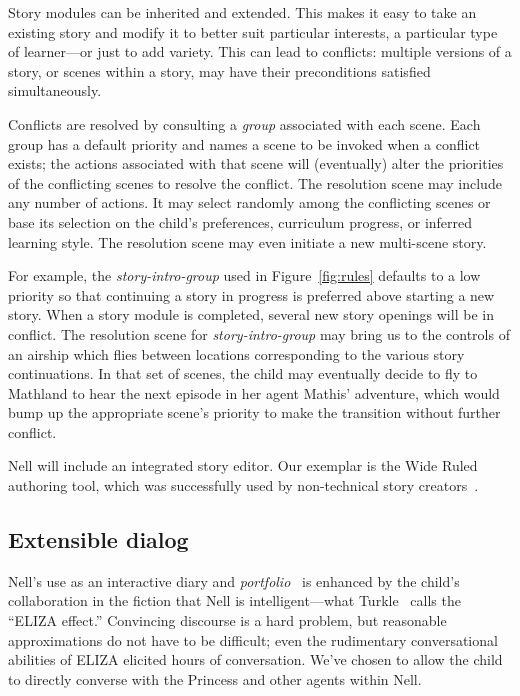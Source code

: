 \documentclass[preprint]{sig-alternate}
\begin{document}
Story modules can be inherited and extended.
This makes it easy to take an existing story and modify it to
better suit particular interests, a particular type of learner---or
just to add variety.  This can lead to conflicts: multiple versions of
a story, or scenes within a story, may have their
preconditions satisfied simultaneously.

Conflicts are resolved by consulting a \textit{group} associated with
each scene.  Each group has a default priority and names a scene to be
invoked when a conflict exists; the actions associated with that scene
will (eventually) alter the priorities of the conflicting scenes to
resolve the conflict.  The resolution scene may include any number of
actions.  It may select randomly among the conflicting scenes or base
its selection on the
child's preferences, curriculum progress, or inferred learning style.
The resolution scene may even initiate a new multi-scene story.

For example, the \textit{story-intro-group}
used in Figure~\ref{fig:rules} defaults to a low priority so that
continuing a story in progress is preferred above starting a new story.
When a story module is completed, several new story openings will be in
conflict.  The resolution scene for \textit{story-intro-group} may bring us
to the controls of an airship which flies between locations
corresponding to the various story continuations.  In that set of
scenes, the child may eventually decide to fly to Mathland to hear the
next episode in her agent Mathis' adventure, which would bump up the
appropriate scene's priority to make the transition
without further conflict.

Nell will include an integrated story editor.  Our exemplar is
the Wide Ruled authoring tool, which was successfully used by
non-technical story creators~\cite{skorupski:2009}.


\subsection{Extensible dialog}
Nell's use as an interactive diary and
\textit{portfolio}~\cite{stefanakis:portfolios} is enhanced by the child's
collaboration in the fiction that Nell is intelligent---what
Turkle~\cite{turkle:alone} calls the ``ELIZA effect.''
Convincing discourse is a hard problem, but
reasonable approximations do not have to be difficult; even
the rudimentary conversational abilities of ELIZA elicited hours of
conversation.%
We've chosen to allow the child to directly converse with the
Princess and other agents within Nell.
\end{document}
